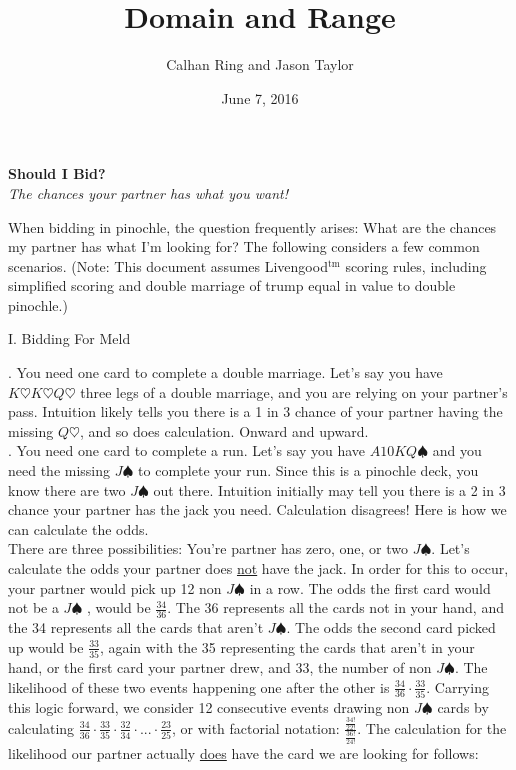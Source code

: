 \documentclass[11pt]{article}
\title{Domain and Range}
\author{Calhan Ring and Jason Taylor}
\date{June 7, 2016}
\begin{document}
\begin{center}
  \textbf{Should I Bid?}\\
  \textit{The chances your partner has what you want!}
\end{center}

When bidding in pinochle, the question frequently arises: What are the chances my partner has what I'm looking for? The following considers a few common scenarios. (Note: This document assumes Livengood$^{\text{tm}}$ scoring rules, including simplified scoring and double marriage of trump equal in value to double pinochle.)

\begin{center}
 I. Bidding For Meld\\
\end{center}

. You need one card to complete a double marriage. Let's say you have $ K\heartsuit K \heartsuit Q \heartsuit $ three legs of a double marriage, and you are relying on your partner's pass. Intuition likely tells you there is a 1 in 3 chance of your partner having the missing $ Q\heartsuit$, and so does calculation. Onward and upward. \\
. You need one card to complete a run. Let's say you have $A10KQ\spadesuit $ and you need the missing $J\spadesuit$ to complete your run. Since this is a pinochle deck, you know there are two $J\spadesuit$ out there. Intuition initially may tell you there is a 2 in 3 chance your partner has the jack you need. Calculation disagrees! Here is how we can calculate the odds.\\
\indent There are three possibilities: You're partner has zero, one, or two  $ J \spadesuit$. Let's calculate the odds your partner does \underline{not} have the jack. In order for this to occur, your partner would pick up 12 non $ J\spadesuit$ in a row. The odds the first card would not be a $ J\spadesuit$ , would be $ \frac{34}{36} $. The 36 represents all the cards not in your hand, and the 34 represents all the cards that aren't $J\spadesuit$. The odds the second card picked up would be $\frac{33}{35}$, again with the 35 representing the cards that aren't in your hand, or the first card your partner drew, and 33, the number of non $J\spadesuit$. The likelihood of these two events happening one after the other is $\frac{34}{36}\cdot \frac{33}{35}$. Carrying this logic forward, we consider 12 consecutive events drawing non $J\spadesuit$ cards by calculating $\frac{34}{36}\cdot \frac{33}{35}\cdot \frac{32}{34}\cdot ... \cdot\frac{23}{25}$, or with factorial notation: $\frac{\frac{34!}{22!}}{\frac{36!}{24!}}$. The calculation for the likelihood our partner actually \underline{does} have the card we are looking for follows:
\end{document}
